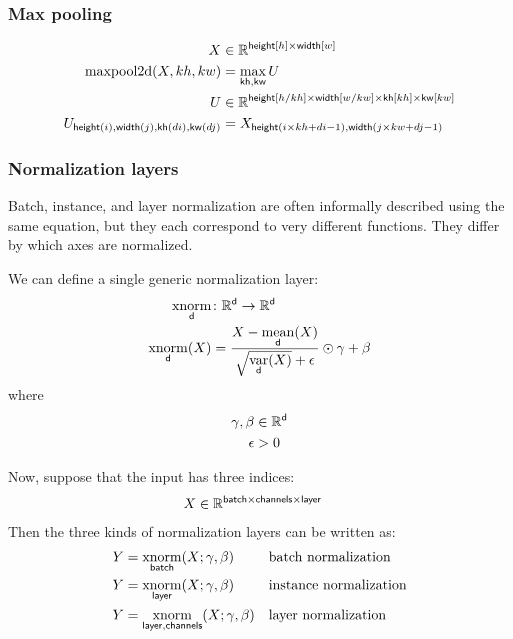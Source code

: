 \documentclass{article}
\newcommand{\reals}{\mathbb{R}}
\begin{document}
\subsubsection{Max pooling}

\begin{align*}
X &\in \reals^{\nset{height}{h} \times \nset{width}{w}} \\
\text{maxpool2d}(X, kh, kw) &=  \nfun{kh, kw}{max} U \\
U &\in \reals^{{\nset{height}{h / kh} \times \nset{width}{w / kw} \times \nset{kh}{kh} \times \nset{kw}{kw}}} \\
U_{\nidx{height}{i}, \nidx{width}{j}, \nidx{kh}{di}, \nidx{kw}{dj}} & = X_{\nidx{height}{i \times kh + di -1}, \nidx{width}{j \times kw + dj -1}}  
\end{align*}

\subsubsection{Normalization layers}

Batch, instance, and layer normalization are often informally described using the same
equation, but they each correspond to very different functions. They differ
by which axes are normalized.

We can define a single generic normalization layer:
\begin{align*}
  \nfun{d}{xnorm} &\colon \mathbb{R}^{\name{d}} \rightarrow \mathbb{R}^{\name{d}} \\
  \nfun{d}{xnorm}(X) &= \frac{X - \nfun{d}{mean}(X)}{\sqrt{\nfun{d}{var}(X)} + \epsilon} \odot \gamma + \beta
\end{align*}
where
\begin{align*}
  \gamma, \beta &\in \mathbb{R}^{\name{d}} \\
  \epsilon &> 0
\end{align*}

Now, suppose that the input has three indices:
\begin{align*}
X &\in \reals^{{\name{batch} \times \name{channels} \times \name{layer}}}
\end{align*}
Then the three kinds of normalization layers can be written as:
\begin{align*}
Y &= \nfun{batch}{xnorm}(X; \gamma, \beta) && \text{batch normalization} \\
Y &= \nfun{layer}{xnorm}(X; \gamma, \beta) && \text{instance normalization} \\
Y &= \nfun{layer,channels}{xnorm}(X; \gamma, \beta) && \text{layer normalization}
\end{align*}
\end{document}

